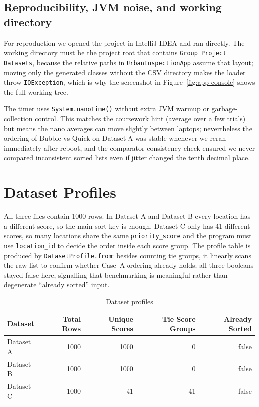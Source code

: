 \documentclass[12pt,a4paper,twocolumn,openany]{report}
\newcommand{\p}[1]{\path{#1}}
\begin{document}
\subsection{Reproducibility, JVM noise, and working directory}
For reproduction we opened the project in IntelliJ IDEA and ran \p{cpt204.app.UrbanInspectionApp.main} directly.
The working directory must be the project root that contains \texttt{Group Project Datasets}, because the relative paths in \texttt{UrbanInspectionApp} assume that layout; moving only the generated classes without the CSV directory makes the loader throw \texttt{IOException}, which is why the screenshot in Figure~\ref{fig:app-console} shows the full working tree.

The timer uses \texttt{System.nanoTime()} without extra JVM warmup or garbage-collection control. 
This matches the coursework hint (average over a few trials) but means the nano averages can move slightly between laptops; nevertheless the ordering of Bubble vs Quick on Dataset A was stable whenever we reran immediately after reboot, and the comparator consistency check ensured we never compared inconsistent sorted lists even if jitter changed the tenth decimal place.

\section{Dataset Profiles}
All three files contain 1000 rows. 
In Dataset A and Dataset B every location has a different score, so the main sort key is enough. 
Dataset C only has 41 different scores, so many locations share the same \texttt{priority\_score} and the program must use \texttt{location\_id} to decide the order inside each score group.
The profile table is produced by \texttt{DatasetProfile.from}: besides counting tie groups, it linearly scans the raw list to confirm whether Case~A ordering already holds; all three booleans stayed false here, signalling that benchmarking is meaningful rather than degenerate ``already sorted'' input.

\begin{table}[t]
\centering
\caption{Dataset profiles}
\scriptsize
\begin{tabular}{lrrrr}
\toprule
Dataset & Total Rows & Unique Scores & Tie Score Groups & Already Sorted \\
\midrule
Dataset A & 1000 & 1000 & 0 & false \\
Dataset B & 1000 & 1000 & 0 & false \\
Dataset C & 1000 & 41 & 41 & false \\
\bottomrule
\end{tabular}
\end{table}
\end{document}
